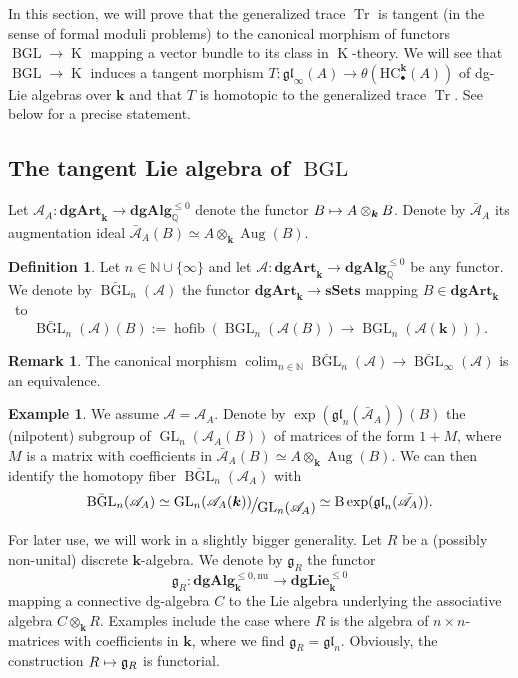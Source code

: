 \documentclass[JEP,XML,SOM,Unicode,NoEqCountersInSection]{cedram}
\let\mathcal\mathscr
\let\autoref\Cref
\newcommand\mto{\mathchoice{\longmapsto}{\mapsto}{\mapsto}{\mapsto}}
\let\widebar\bar
\newcommand{\sbullet}{{\scriptscriptstyle\bullet}}
\theoremstyle{definition}
\newtheorem{df}[thm]{Definition}
\newtheorem{ex}[thm]{Example}
\newtheorem{rmq}[thm]{Remark}
\newcommand{\N}{\mathbb{N}}
\newcommand{\Q}{\mathbb{Q}}
\newcommand{\sSets}{\mathbf{sSets}}
\newcommand{\dgArt}{\mathbf{dgArt}}
\newcommand{\dgLie}{\mathbf{dgLie}}
\newcommand{\dgAlg}{\mathbf{dgAlg}}
\DeclareMathOperator{\colim}{colim}
\DeclareMathOperator{\BGL}{BGL}
\DeclareMathOperator{\K}{K}
\newcommand{\B}{\mathrm{B}}
\newcommand{\gl}{\mathfrak{gl}}
\newcommand{\quot}[2]{\ensuremath \mathchoice {\displaystyle #1 \raisebox{-2pt}{$\displaystyle \hspace{-1pt}{\big/} $} \raisebox{-4pt}{$\displaystyle \hspace{-1pt}{#2}$}}{\textstyle #1 \raisebox{-1pt}{$\textstyle \hspace{-1pt}{/} $} \raisebox{-2pt}{$\textstyle \hspace{-1pt}{#2}$}}{\scriptstyle #1 \raisebox{-1pt}{$\scriptstyle \hspace{-1pt}{/} $} \raisebox{-2pt}{$\scriptstyle \hspace{-1pt}{#2}$}}{\scriptscriptstyle #1 \raisebox{-1pt}{$\scriptscriptstyle \hspace{-1pt}{/} $} \raisebox{-2pt}{$\scriptscriptstyle \hspace{-1pt}{#2}$}}}
\newcommand{\GL}{\operatorname{GL}}
\newcommand{\bBGL}{\widebar{\BGL}}
\newcommand{\HC}{\mathrm{HC}}
\newcommand{\Aug}{\operatorname{Aug}}
\renewcommand{\k}{{\boldsymbol{k}}}
\newcommand{\Ac}{\mathcal{A}}
\newcommand{\bAc}{\widebar{\mathcal{A}}}
\newcommand{\hofib}{\operatorname{hofib}}
\newcommand{\Tr}{\operatorname{Tr}}
\newcommand{\g}{\mathfrak{g}}
\begin{document}
In this section, we will prove that the generalized trace $\Tr$ is tangent (in the sense of formal moduli problems) to the canonical morphism of functors $\BGL \to \K$ mapping a vector bundle to its class in $\K$-theory.
We will see that $\BGL \to \K$ induces a tangent morphism $T \colon \gl_\infty(A) \to \theta(\HC_\sbullet^\k(A))$ of dg-Lie algebras over $\k$ and that $T$ is homotopic to the generalized trace $\Tr$. See \autoref{thm:compLQT} below for a precise statement.

\subsection{The tangent Lie algebra of \texorpdfstring{$\BGL$}{BGL}}
Let $\Ac_A \colon \dgArt_\k \to \dgAlg_\Q^{\leq 0}$ denote the functor $B \mto A \otimes_\k B$. Denote by $\bAc_A$ its augmentation ideal $\bAc_A(B) \simeq A \otimes_\k \Aug(B)$.

\begin{df} Let $n \in \N \cup \{\infty\}$ and let $\Ac \colon \dgArt_\k \to \dgAlg_\Q^{\leq 0}$ be any functor.
We denote by $\bBGL_n(\Ac)$ the functor $\dgArt_\k \to \sSets$ mapping $B \in \dgArt_\k$~to
\[
\bBGL_n(\Ac)(B) := \hofib(\BGL_n(\Ac(B)) \to \BGL_n(\Ac(\k))).
\]
\end{df}

\begin{rmq}
The canonical morphism $\colim_{n \in \N} \bBGL_n(\Ac) \to \bBGL_\infty(\Ac)$ is an equivalence.
\end{rmq}

\begin{ex}
We assume $\Ac = \Ac_A$.
Denote by $\exp(\gl_n(\bAc_A))(B)$ the (nilpotent) subgroup of $\GL_n(\Ac_{A}(B))$ of matrices of the form $1 + M$, where $M$ is a matrix with coefficients in $\bAc_A(B) \simeq A \otimes_\k \Aug(B)$.
We can then identify the homotopy fiber $\bBGL_n(\Ac_A)$ with
\[
\bBGL_n(\Ac_A) \simeq \quot{\GL_n(\Ac_A(\k))}{\GL_n(\Ac_A)} \simeq \B \exp(\gl_n(\bAc_A)).
\]
\end{ex}

For later use, we will work in a slightly bigger generality.
Let $R$ be a (possibly non-unital) discrete $\k$-algebra. We denote by $\g_R$ the functor
\[
\g_R \colon \dgAlg_\k^{\leq 0,\mathrm{nu}} \to \dgLie_\k^{\leq 0}
\]
mapping a connective dg-algebra $C$ to the Lie algebra underlying the associative algebra $C \otimes_\k R$.
Examples include the case where $R$ is the algebra of $n \times n$-matrices with coefficients in $\k$, where we find $\g_R = \gl_n$.
Obviously, the construction $R \mto \g_R$ is functorial.
\end{document}
